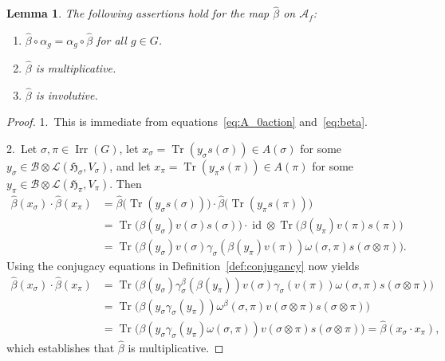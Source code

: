 \documentclass[pdftex]{sigma}
\numberwithin{equation}{section}
\newtheorem{Lemma}[Theorem]{Lemma}
\newcommand*{\tensor}{\otimes}		%
\DeclareMathOperator{\id}{id}		%
\DeclareMathOperator{\Tr}{Tr}		%
\newcommand*{\hilb}{\mathfrak}		%
\newcommand*{\alg}{\mathcal}		%
\newcommand*{\hH}{\hilb{H}}			%
\newcommand*{\aA}{\alg{A}}			%
\newcommand*{\aB}{\alg{B}} 			%
\newcommand*{\End}{\mathcal{L}} %
\DeclareMathOperator{\Irrep}{Irr} 			%
\begin{document}
\begin{Lemma}\label{lem:prop_beta}
	The following assertions hold for the map $\hat \beta$ on $\aA_f$:
	\begin{enumerate}\itemsep=0pt
	\item[$1.$]
		$\hat\beta \circ \alpha_g = \alpha_g \circ \hat \beta$ for all $g \in G$.
	\item[$2.$]
		$\hat\beta$ is multiplicative.
	\item[$3.$]
		$\hat\beta$ is involutive.
	\end{enumerate}
\end{Lemma}
\begin{proof}1.~This is immediate from equations~\eqref{eq:A_0action} and~\eqref{eq:beta}.

2.~Let $\sigma, \pi \in \Irrep(G)$, let $x_\sigma = \Tr (y_\sigma s(\sigma)) \in A(\sigma)$ for some $y_\sigma \in \aB \tensor \End(\hH_\sigma, V_\sigma)$, and let $x_\pi = \Tr ( y_\pi s(\pi) ) \in A(\pi)$ for some $y_\pi \in \aB \tensor \End(\hH_\pi, V_\pi)$.
		Then
		\begin{align*}
			\hat\beta(x_\sigma) \cdot \hat\beta(x_\pi)
			&=
			\hat\beta \bigl( \Tr( y_\sigma s(\sigma) ) \bigr)
			\cdot \hat \beta \bigl( \Tr (y_\pi s(\pi) ) \bigr)
			\\
			&=
			\Tr \bigl( \beta(y_\sigma) v(\sigma) s(\sigma) \bigr)
			\cdot \id \tensor \Tr \bigl( \beta(y_\pi) v(\pi) s(\pi) \bigr)
			\\
			&=
			\Tr \bigl( \beta(y_\sigma) v(\sigma) \gamma_\sigma ( \beta(y_\pi) v(\pi) ) \omega(\sigma, \pi) s(\sigma \tensor \pi) \bigr).
		\end{align*}
		Using the conjugacy equations in Definition~\ref{def:conjugancy} now yields
		\begin{align*}
			\hat\beta(x_\sigma) \cdot \hat\beta(x_\pi)
			&=
			\Tr \bigl( \beta(y_\sigma) \gamma^\beta_\sigma ( \beta(y_\pi) ) v(\sigma) \gamma_\sigma ( v(\pi) ) \omega(\sigma, \pi) s(\sigma \tensor \pi) \bigr)
			\\
			&= \Tr \bigl( \beta ( y_\sigma \gamma_\sigma(y_\pi) ) \omega^\beta(\sigma, \pi) v(\sigma \tensor \pi) s(\sigma \tensor \pi) \bigr)
			\\
			&= \Tr \bigl( \beta ( y_\sigma \gamma_\sigma(y_\pi) \omega(\sigma, \pi) ) v(\sigma \tensor \pi) s(\sigma \tensor \pi) \bigr)
			=
			\hat\beta(x_\sigma \cdot x_\pi),
		\end{align*}
		which establishes that $\hat\beta$ is multiplicative.


\end{proof}
\end{document}
